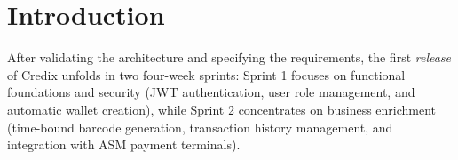 \section*{Introduction}

After validating the architecture and specifying the requirements, the first \emph{release} of Credix unfolds in two four-week sprints: Sprint 1 focuses on functional foundations and security (JWT authentication, user role management, and automatic wallet creation), while Sprint 2 concentrates on business enrichment (time-bound barcode generation, transaction history management, and integration with ASM payment terminals).
